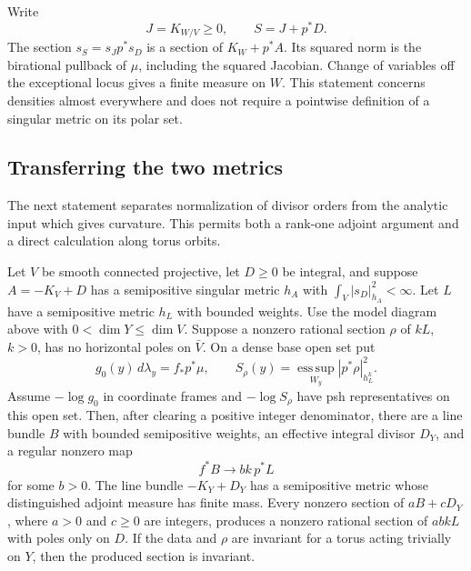 Write
\[
 J=K_{W/V}\geq0,\qquad S=J+p^*D.
\]
The section $s_S=s_Jp^*s_D$ is a section of $K_W+p^*A$.  Its squared
norm is the birational pullback of $\mu$, including the squared Jacobian.
Change of variables off the exceptional locus gives a finite measure
on $W$.  This statement concerns densities almost everywhere and does
not require a pointwise definition of a singular metric on its polar
set.

\subsection{Transferring the two metrics}

The next statement separates normalization of divisor orders from the
analytic input which gives curvature.  This permits both a rank-one
adjoint argument and a direct calculation along torus orbits.

\begin{lemma}\label{g:transfer}\label{g:transfer-recalled}\label{rb:transfer}
Let $V$ be smooth connected projective, let $D\geq0$ be integral,
and suppose $A=-K_V+D$ has a semipositive singular metric $h_A$ with
$\int_V|s_D|_{h_A}^2<\infty$. Let $L$ have a semipositive metric $h_L$
with bounded weights.  Use the model diagram above with
$0<\dim Y\leq\dim V$.  Suppose a nonzero rational section $\rho$ of $kL$,
$k>0$, has no horizontal poles on $\bar V$.  On a dense base open set
put
\[
 g_0(y)\,d\lambda_y=f_*p^*\mu,
 \qquad
 S_\rho(y)=\operatorname*{ess\,sup}_{W_y}|p^*\rho|_{h_L^k}^2.
\]
Assume $-\log g_0$ in coordinate frames and $-\log S_\rho$ have psh
representatives on this open set.  Then, after clearing a positive
integer denominator, there are a line bundle $B$ with bounded
semipositive weights, an effective integral divisor $D_Y$, and a
regular nonzero map
\[
                   f^*B\longrightarrow bk\,p^*L
\]
for some $b>0$.  The line bundle $-K_Y+D_Y$ has a semipositive metric
whose distinguished adjoint measure has finite mass.  Every nonzero section
of $aB+cD_Y$, where $a>0$ and $c\geq0$ are integers, produces a
nonzero rational section of $abkL$ with poles only on $D$.
If the data and $\rho$ are invariant for a torus acting trivially on
$Y$, then the produced section is invariant.
\end{lemma}

